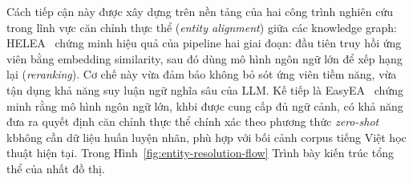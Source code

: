 Cách tiếp cận này được xây dựng trên nền tảng của hai công trình nghiên
cứu trong lĩnh vực căn chỉnh thực thể (\textit{entity alignment}) giữa
các knowledge graph: HELEA~\cite{helea2024} chứng minh hiệu quả của
    pipeline hai giai đoạn: đầu tiên truy hồi ứng viên bằng embedding
    similarity, sau đó dùng mô hình ngôn ngữ lớn để xếp hạng lại
    (\textit{reranking}). Cơ chế này vừa đảm bảo không bỏ sót ứng viên
    tiềm năng, vừa tận dụng khả năng suy luận ngữ nghĩa sâu của LLM. Kế tiếp là EasyEA~\cite{easyea2024} chứng minh rằng mô hình
    ngôn ngữ lớn, khbi được cung cấp đủ ngữ cảnh, có khả năng đưa ra
    quyết định căn chỉnh thực thể chính xác theo phương thức
    \textit{zero-shot} kbhông cần dữ liệu huấn luyện nhãn, phù hợp
    với bối cảnh corpus tiếng Việt học thuật hiện tại. Trong Hình~\ref{fig:entity-resolution-flow} Trình bày kiến trúc tổng thể của
nhất đồ thị.

